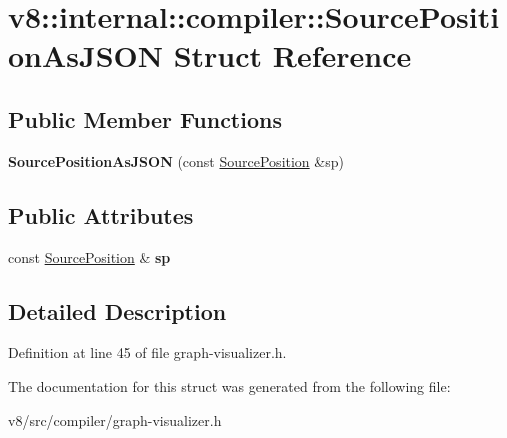 \hypertarget{structv8_1_1internal_1_1compiler_1_1SourcePositionAsJSON}{}\section{v8\+:\+:internal\+:\+:compiler\+:\+:Source\+Position\+As\+J\+S\+ON Struct Reference}
\label{structv8_1_1internal_1_1compiler_1_1SourcePositionAsJSON}
\subsection*{Public Member Functions}
\begin{DoxyCompactItemize}
\item 
\mbox{\label{structv8_1_1internal_1_1compiler_1_1SourcePositionAsJSON_aadaf07a33e3f7d4508d570d6f8744bd8}} 
{\bfseries Source\+Position\+As\+J\+S\+ON} (const \mbox{\hyperlink{classv8_1_1internal_1_1SourcePosition}{Source\+Position}} \&sp)
\end{DoxyCompactItemize}
\subsection*{Public Attributes}
\begin{DoxyCompactItemize}
\item 
\mbox{\label{structv8_1_1internal_1_1compiler_1_1SourcePositionAsJSON_a396e104fff3fd576bd538ef57c2be1f8}} 
const \mbox{\hyperlink{classv8_1_1internal_1_1SourcePosition}{Source\+Position}} \& {\bfseries sp}
\end{DoxyCompactItemize}


\subsection{Detailed Description}


Definition at line 45 of file graph-\/visualizer.\+h.



The documentation for this struct was generated from the following file\+:\begin{DoxyCompactItemize}
\item 
v8/src/compiler/graph-\/visualizer.\+h\end{DoxyCompactItemize}

